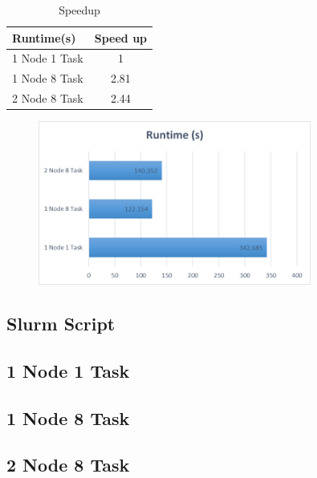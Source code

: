 \documentclass[11pt]{article}
\begin{document}
\begin{table}[]
\begin{tabular}{c|c}
\multicolumn{1}{l|}{Runtime(s)} & \multicolumn{1}{l}{Speed up} \\ \hline
1 Node 1 Task                   & 1                            \\
1 Node 8 Task                   & 2.81                         \\
2 Node 8 Task                   & 2.44                        
\end{tabular}
\caption{Speedup}
\label{Speedup}
\end{table}
\begin{figure}[h]
\includegraphics[width=0.8\textwidth]{Runtime}
\end{figure}

\begin{appendices}
\appendixpage
\section{Slurm Script}
\subsection{1 Node 1 Task}

\subsection{1 Node 8 Task}

\subsection{2 Node 8 Task}

\end{appendices}
\end{document}
